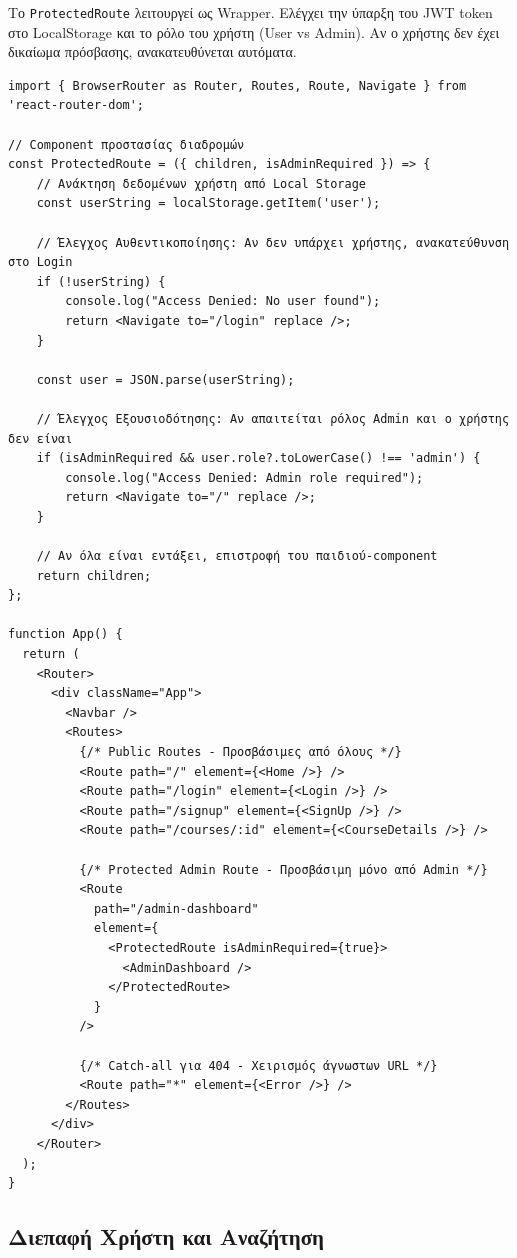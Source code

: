\documentclass[a4paper,12pt]{article}
\begin{document}
Το \texttt{ProtectedRoute} λειτουργεί ως Wrapper. Ελέγχει την ύπαρξη του JWT token στο LocalStorage και το ρόλο του χρήστη (User vs Admin). Αν ο χρήστης δεν έχει δικαίωμα πρόσβασης, ανακατευθύνεται αυτόματα.

\begin{verbatim}
import { BrowserRouter as Router, Routes, Route, Navigate } from 'react-router-dom';

// Component προστασίας διαδρομών
const ProtectedRoute = ({ children, isAdminRequired }) => {
    // Ανάκτηση δεδομένων χρήστη από Local Storage
    const userString = localStorage.getItem('user');
    
    // Έλεγχος Αυθεντικοποίησης: Αν δεν υπάρχει χρήστης, ανακατεύθυνση στο Login
    if (!userString) {
        console.log("Access Denied: No user found");
        return <Navigate to="/login" replace />;
    }
    
    const user = JSON.parse(userString);

    // Έλεγχος Εξουσιοδότησης: Αν απαιτείται ρόλος Admin και ο χρήστης δεν είναι
    if (isAdminRequired && user.role?.toLowerCase() !== 'admin') {
        console.log("Access Denied: Admin role required");
        return <Navigate to="/" replace />;
    }

    // Αν όλα είναι εντάξει, επιστροφή του παιδιού-component
    return children;
};

function App() {
  return (
    <Router>
      <div className="App">
        <Navbar />
        <Routes>
          {/* Public Routes - Προσβάσιμες από όλους */}
          <Route path="/" element={<Home />} />
          <Route path="/login" element={<Login />} />
          <Route path="/signup" element={<SignUp />} />
          <Route path="/courses/:id" element={<CourseDetails />} />

          {/* Protected Admin Route - Προσβάσιμη μόνο από Admin */}
          <Route 
            path="/admin-dashboard" 
            element={
              <ProtectedRoute isAdminRequired={true}>
                <AdminDashboard />
              </ProtectedRoute>
            } 
          />
          
          {/* Catch-all για 404 - Χειρισμός άγνωστων URL */}
          <Route path="*" element={<Error />} />
        </Routes>
      </div>
    </Router>
  );
}
\end{verbatim}

\subsection{Διεπαφή Χρήστη και Αναζήτηση}
\end{document}

